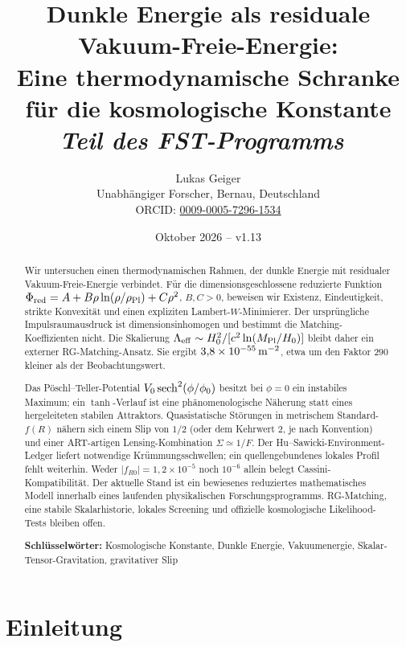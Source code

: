 \documentclass[12pt,a4paper]{article}
\title{{\Large\textbf{Dunkle Energie als residuale Vakuum-Freie-Energie:\\
Eine thermodynamische Schranke für die kosmologische Konstante}}\\
\large\textit{Teil des FST-Programms~\cite{GeigerFST-Hub-2026}}}
\author{Lukas Geiger\\
\small Unabhängiger Forscher, Bernau, Deutschland\\
\small ORCID: \href{https://orcid.org/0009-0005-7296-1534}{0009-0005-7296-1534}}
\date{Oktober 2026 -- v1.13}
\theoremstyle{definition}
\theoremstyle{plain}
\theoremstyle{remark}
\begin{document}
\maketitle
\vspace{-2.8em}

\begin{abstract}\small
Wir untersuchen einen thermodynamischen Rahmen, der dunkle Energie mit
residualer Vakuum-Freie-Energie verbindet. Für die dimensionsgeschlossene
reduzierte Funktion
\(\Phi_{\rm red}=A+B\rho\ln(\rho/\rho_{\rm Pl})+C\rho^2\), \(B,C>0\),
beweisen wir Existenz, Eindeutigkeit, strikte Konvexität und einen expliziten
Lambert-\(W\)-Minimierer. Der ursprüngliche Impulsraumausdruck ist
dimensionsinhomogen und bestimmt die Matching-Koeffizienten nicht.
Die Skalierung \(\Lambda_{\rm eff}\sim H_0^2/[c^2\ln(M_{\rm Pl}/H_0)]\)
bleibt daher ein externer RG-Matching-Ansatz. Sie ergibt
\(3{,}8\times10^{-55}\,{\rm m}^{-2}\), etwa um den Faktor \(290\) kleiner
als der Beobachtungswert.

Das Pöschl--Teller-Potential \(V_0\,{\rm sech}^2(\phi/\phi_0)\) besitzt
bei \(\phi=0\) ein instabiles Maximum; ein \(\tanh\)-Verlauf ist eine
phänomenologische Näherung statt eines hergeleiteten stabilen Attraktors.
Quasistatische Störungen in metrischem Standard-\(f(R)\) nähern sich einem
Slip von \(1/2\) (oder dem Kehrwert \(2\), je nach Konvention) und einer
ART-artigen Lensing-Kombination \(\Sigma\simeq1/F\).
Der Hu--Sawicki-Environment-Ledger liefert notwendige Krümmungsschwellen;
ein quellengebundenes lokales Profil fehlt weiterhin. Weder
\(|f_{R0}|=1{,}2\times10^{-5}\) noch \(10^{-6}\) allein belegt
Cassini-Kompatibilität. Der aktuelle Stand ist ein bewiesenes reduziertes
mathematisches Modell innerhalb eines laufenden physikalischen
Forschungsprogramms. RG-Matching, eine stabile Skalarhistorie, lokales
Screening und offizielle kosmologische Likelihood-Tests bleiben offen.
\par\vspace{0.6em}
\noindent\textbf{Schlüsselwörter:} Kosmologische Konstante, Dunkle Energie,
Vakuumenergie, Skalar-Tensor-Gravitation, gravitativer Slip
\end{abstract}

\clearpage
\tableofcontents
\clearpage
\section{Einleitung}\label{sec:intro}
\end{document}
